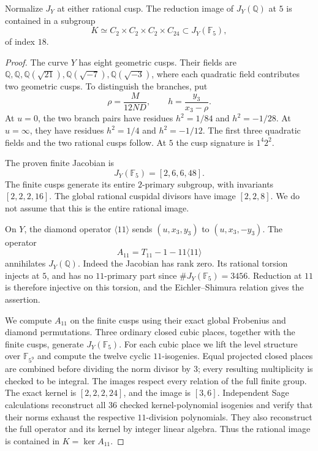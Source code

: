 \begin{lemma}\label{lem:nonic242-quotient5-hecke}
Normalize $J_Y$ at either rational cusp. The reduction image
of $J_Y(\mathbb Q)$ at $5$ is contained in a subgroup
\[
 K\simeq C_2\times C_2\times C_2\times C_{24}
 \subset J_Y(\mathbb F_5),
\]
of index $18$.
\end{lemma}
\begin{proof}
The curve $Y$ has eight geometric cusps. Their fields are
$\mathbb Q,\mathbb Q,\mathbb Q(\sqrt{21}),
\mathbb Q(\sqrt{-7}),\mathbb Q(\sqrt{-3})$,
where each quadratic field contributes two geometric cusps.
To distinguish the branches, put
\[
 \rho=\frac{M}{12ND},\qquad h=\frac{y_3}{x_3-\rho}.
\]
At $u=0$, the two branch pairs have residues
$h^2=1/84$ and $h^2=-1/28$.
At $u=\infty$, they have residues
$h^2=1/4$ and $h^2=-1/12$.
The first three quadratic fields and the two rational cusps follow.
At $5$ the cusp signature is $1^4 2^2$.

The proven finite Jacobian is
\[
 J_Y(\mathbb F_5)=[2,6,6,48].
\]
The finite cusps generate its entire $2$-primary subgroup,
with invariants $[2,2,2,16]$.
The global rational cuspidal divisors have image $[2,2,8]$.
We do not assume that this is the entire rational image.

On $Y$, the diamond operator $\langle11\rangle$ sends
$(u,x_3,y_3)$ to $(u,x_3,-y_3)$.
The operator
\[
 A_{11}=T_{11}-1-11\langle11\rangle
\]
annihilates $J_Y(\mathbb Q)$.
Indeed the Jacobian has rank zero. Its rational torsion injects
at $5$, and has no $11$-primary part since
$\#J_Y(\mathbb F_5)=3456$. Reduction at $11$ is therefore
injective on this torsion, and the Eichler--Shimura relation gives
the assertion.

We compute $A_{11}$ on the finite cusps using their exact global
Frobenius and diamond permutations. Three ordinary closed cubic
places, together with the finite cusps, generate
$J_Y(\mathbb F_5)$. For each cubic place we lift the level
structure over $\mathbb F_{5^9}$ and compute the twelve cyclic
$11$-isogenies. Equal projected closed places are combined before
dividing the norm divisor by $3$; every resulting multiplicity
is checked to be integral.
The images respect every relation of the full finite group.
The exact kernel is $[2,2,2,24]$, and the image is $[3,6]$.
Independent Sage calculations reconstruct all $36$ checked
kernel-polynomial isogenies and verify that their norms exhaust
the respective $11$-division polynomials. They also reconstruct
the full operator and its kernel by integer linear algebra.
Thus the rational image is contained in $K=\ker A_{11}$.
\end{proof}

